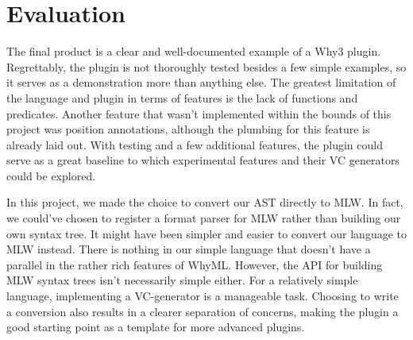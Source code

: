 \section{Evaluation} %

The final product is a clear and well-documented example of a Why3 plugin.
Regrettably, the plugin is not thoroughly tested besides a few simple examples,
so it serves as a demonstration more than anything else.
The greatest limitation of the language and plugin in terms of features
is the lack of functions and predicates.
Another feature that wasn't implemented within the bounds of this project was position annotations,
although the plumbing for this feature is already laid out.
With testing and a few additional features,
the plugin could serve as a great baseline
to which experimental features and their VC generators could be explored.

In this project, we made the choice to convert our AST directly to MLW.
In fact, we could've chosen to register a format parser for MLW
rather than building our own syntax tree.
It might have been simpler and easier to convert our language to MLW instead.
There is nothing in our simple language
that doesn't have a parallel in the rather rich features of WhyML.
However, the API for building MLW syntax trees isn't necessarily simple either.
For a relatively simple language,
implementing a VC-generator is a manageable task.
Choosing to write a conversion also results in a clearer separation of concerns,
making the plugin a good starting point as a template for more advanced plugins.
